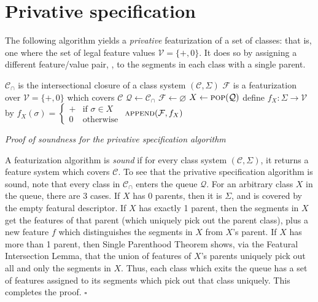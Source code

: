 \documentclass[11pt, oneside]{article}   	%
\begin{document}
\FloatBarrier
\section{Privative specification}
\label{sec:privative}

The following algorithm yields a \textit{privative} featurization of a set of classes: that is, one where the set of legal feature values $\mathcal V = \{+, 0\}$. It does so by assigning a different feature/value pair, , to the segments in each class with a single parent.
 
\noindent \begin{algorithmic}
    \REQUIRE $\mathcal C_\cap$ is the intersectional closure of a class system $(\mathcal C, \Sigma)$
    \ENSURE $\mathcal F$ is a featurization over $\mathcal V = \{ +, 0 \}$ which covers $\mathcal C$
    \STATE
    \STATE $\mathcal Q \leftarrow \mathcal C_\cap$
    \STATE $\mathcal F \leftarrow \varnothing$
    \STATE
        \STATE $X \leftarrow \textsc{pop}(\mathcal Q)$
            \STATE define $f_X : \Sigma \rightarrow \mathcal V$ by $f_X(\sigma) = \begin{cases}
                + & \mbox{if } \sigma \in X \\
                0 & \mbox{otherwise}
                \end{cases} $
            \STATE $\textsc{append}(\mathcal F, f_X)$
        \ENDIF
    \ENDWHILE
\end{algorithmic}

\vspace{\baselineskip} \noindent \textit{Proof of soundness for the privative specification algorithm}

A featurization algorithm is \textit{sound} if for every class system $(\mathcal C, \Sigma)$, it returns a feature system which covers $\mathcal C$. To see that the privative specification algorithm is sound, note that every class in $\mathcal C_\cap$ enters the queue $\mathcal Q$. For an arbitrary class $X$ in the queue, there are 3 cases. If $X$ has 0 parents, then it is $\Sigma$, and is covered by the empty featural descriptor. If $X$ has exactly 1 parent, then the segments in $X$ get the features of that parent (which uniquely pick out the parent class), plus a new feature $f$ which distinguishes the segments in $X$ from $X$'s parent. If $X$ has more than 1 parent, then Single Parenthood Theorem shows, via the Featural Intersection Lemma, that the union of features of $X$'s parents uniquely pick out all and only the segments in $X$. Thus, each class which exits the queue has a set of features assigned to its segments which pick out that class uniquely. This completes the proof. $\square$
\end{document}
